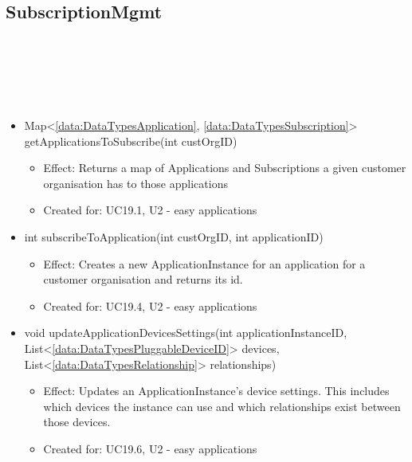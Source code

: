   \subsection{SubscriptionMgmt}\label{int:OnlineServiceOnlineServiceCustomerOrganisationFacadeSubscriptionMgmt}
    \begin{description}
      \item[Provided by:] \iconcomponent{}~
      \item[Required by:] \iconcomponent{}~
      \item[Operations:] ~
    \begin{itemize}[noitemsep,nolistsep,leftmargin=-.25cm]
      \item \textsf{Map\textless{}\ref{data:DataTypesApplication}, \ref{data:DataTypesSubscription}\textgreater{} getApplicationsToSubscribe(int custOrgID)}
        \begin{itemize}[noitemsep,nolistsep]
           \item Effect: Returns a map of Applications and Subscriptions a given customer organisation has to those applications
\item Created for: UC19.1, U2 - easy applications
        \end{itemize}
      \item \textsf{int subscribeToApplication(int custOrgID, int applicationID)}
        \begin{itemize}[noitemsep,nolistsep]
           \item Effect: Creates a new ApplicationInstance for an application for a customer organisation and returns its id.
\item Created for: UC19.4, U2 - easy applications
        \end{itemize}
      \item \textsf{void updateApplicationDevicesSettings(int applicationInstanceID, List\textless{}\ref{data:DataTypesPluggableDeviceID}\textgreater{} devices, List\textless{}\ref{data:DataTypesRelationship}\textgreater{} relationships)}
        \begin{itemize}[noitemsep,nolistsep]
           \item Effect: Updates an ApplicationInstance's device settings. This includes which devices the instance can use and which relationships exist between those devices.
\item Created for: UC19.6, U2 - easy applications

\end{itemize}
\end{itemize}
\end{description}
